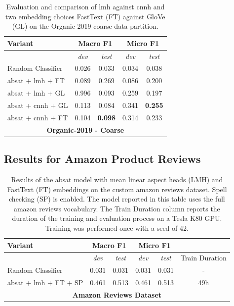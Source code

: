 \begin{table}[htb]
	\centering
	\begin{tabular*}{\textwidth}{l@{\extracolsep{\fill}}cccc@{}}
	\toprule
	Variant          & \multicolumn{2}{c}{\textbf{Macro F1}}     & \multicolumn{2}{c}{\textbf{Micro F1}}       \\ 
	\midrule
					 & \textit{dev}      	& \textit{test} 		& \textit{dev}      		& \textit{test} 		\\
	\midrule

	Random Classifier          		&  0.026 		& 0.033&  0.034 &   0.038  				\\
	\gls{absat} + \gls{lmh} + FT    & 0.089     & 0.269	&  0.086 &   0.200   			\\ 
	\gls{absat} + \gls{lmh} + GL    & 0.996     & 0.093	&  0.259 &   0.197   			\\ 

	\gls{absat} + \gls{cnnh} + GL   & 0.113     & 0.084	& 0.341   &  \textbf{0.255} 				\\ 	
	\gls{absat} + \gls{cnnh} + FT   & 0.104     & \textbf{0.098} & 0.314  &   0.233				\\ 
	\bottomrule
	\multicolumn{5}{c}{\textbf{Organic-2019 - Coarse}} \\
	\end{tabular*}
	\caption{Evaluation and comparison of \acrfull{lmh} against \acrfull{cnnh} and two embedding choices FastText {(FT)} against GloVe {(GL)} on the Organic-2019 coarse data partition.}
	\label{tab:06_resultsOrganic2}
\end{table}

\subsection{Results for Amazon Product Reviews}
\label{sec:06_ResultsAmazon}

\begin{table}[htb]
	\centering
	\begin{tabular*}{\textwidth}{l@{\extracolsep{\fill}}ccccc@{}}
	\toprule
	Variant          & \multicolumn{2}{c}{\textbf{Macro F1}}     & \multicolumn{2}{c}{\textbf{Micro F1}} &       \\ 
	\midrule
					 & \textit{dev}      	& \textit{test} 		& \textit{dev}      		& \textit{test} & Train Duration		\\
	\midrule
	Random Classifier          			&  0.031		& 0.031  	&  0.031		&   0.031	& -		\\
	\gls{absat} + \gls{lmh} + FT + SP   & 0.461         & 0.513		&  0.461        &   0.513   & 49h			\\ 
	\bottomrule
	\multicolumn{6}{c}{\textbf{Amazon Reviews Dataset}} \\
	\end{tabular*}
	\caption{Results of the \gls{absat} model with mean linear aspect heads {(LMH)} and FastText {(FT)} embeddings on the custom amazon reviews dataset. Spell checking {(SP)} is enabled. The model reported in this table uses the full amazon reviews vocabulary. The Train Duration column reports the duration of the training and evaluation process on a Tesla K80 GPU. Training was performed once with a seed of 42.}
	\label{tab:06_resultsAmazonFull}
\end{table}

